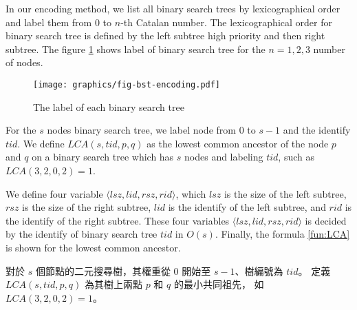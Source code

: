 In our encoding method,  we list all binary search trees by
lexicographical order and label them from $0$ to $n$-th Catalan number.
The lexicographical order for binary search tree is defined by the left
subtree high priority and then right subtree.  The figure
\ref{fig:labelingBST} shows label of binary search tree for the
$n=1,2,3$ number of nodes.

\iffalse
關於在線操作，我們從 Fischer \cite{fischer} 和 Masud \cite{masud} 的研究中，
分別得到關於笛卡爾的編碼與快取改善的技術，而這些技術都著手於離線操作，
即一開始給訂 $n$ 個元素值，並且在 $O(n)$ 時間內編碼一棵樹；
接著，再利用前處理的查找表完成極值查找。

關於快取效能，因詢問次數與元素個數相當，
故無法像 Masud \cite{masud} 的研究藉由排序編碼以減少快取未中的問題，
只能依賴數據本身的分佈和編碼之間的關聯來減少快取未中的情況。

從上述幾點觀點出發，我們提出動態的編碼方式。
算法採用字典順序的方式編碼一棵樹，優先增長左子樹，
當相同左子樹時，增長右子樹的方式進行編號，其編碼方式如圖 \ref{fig:lablingBST}。
\fi

\begin{figure}[!thb]
  \centering
  \texttt{[image: graphics/fig-bst-encoding.pdf]}
  \caption{The label of each binary search tree}
  \label{fig:labelingBST}
\end{figure}

For the $s$ nodes binary search tree, we label node from $0$ to $s-1$
and the identify $\mathit{tid}$.  We define $\mathit{LCA}(s,
\mathit{tid}, p, q)$ as the lowest common ancestor of the node $p$ and
$q$ on a binary search tree which has $s$ nodes and labeling
$\mathit{tid}$, such as $\mathit{LCA}(3, 2, 0, 2) = 1$.

We define four variable
$\langle\mathit{lsz},\mathit{lid},\mathit{rsz},\mathit{rid}\rangle$,
which $\mathit{lsz}$ is the size of the left subtree, $\mathit{rsz}$
is the size of the right subtree, $\mathit{lid}$ is the identify of
the left subtree, and $\mathit{rid}$ is the identify of the right
subtree.  These four variables
$\langle\mathit{lsz},\mathit{lid},\mathit{rsz},\mathit{rid}\rangle$ is
decided by the identify of binary search tree $\mathit{tid}$ in
$O(s)$.  Finally, the formula \ref{fun:LCA} is shown for the lowest
common ancestor.

\iffalse
對於 $s$ 個節點的二元搜尋樹，其權重從 $0$ 開始至 $s-1$、樹編號為 $\mathit{tid}$。
定義 $\mathit{LCA}(s, \mathit{tid}, p, q)$ 為其樹上兩點 $p$ 和 $q$ 的最小共同祖先，
如 $\mathit{LCA}(3, 2, 0, 2) = 1$。

